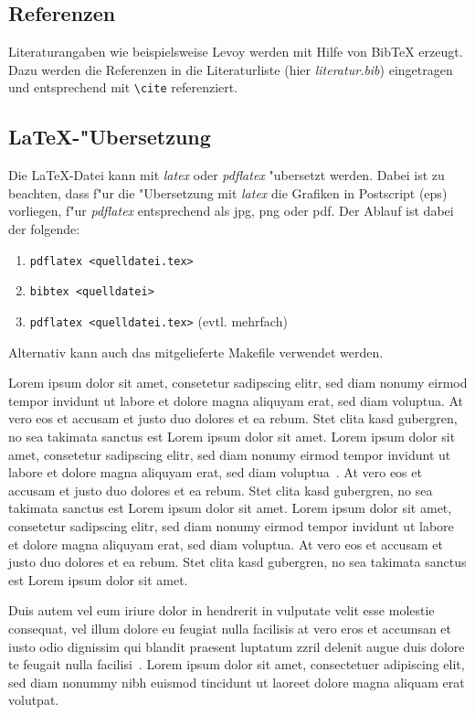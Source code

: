 \documentclass[journal]{vgtc}
\begin{document}
\subsection{Referenzen}

Literaturangaben wie beispielsweise Levoy \cite{levoy:1989:DSV} werden
mit Hilfe von BibTeX erzeugt. Dazu werden die Referenzen in die
Literaturliste (hier \emph{literatur.bib}) eingetragen und
entsprechend mit \verb|\cite| referenziert.

\subsection{\LaTeX-"Ubersetzung}

Die \LaTeX-Datei kann mit \emph{latex} oder \emph{pdflatex} "ubersetzt
werden. Dabei ist zu beachten, dass f"ur die "Ubersetzung mit
\emph{latex} die Grafiken in Postscript (eps) vorliegen, f"ur
\emph{pdflatex} entsprechend als jpg, png oder pdf.  Der Ablauf ist
dabei der folgende:
\begin{enumerate}
\item \verb|pdflatex <quelldatei.tex>|
\item \verb|bibtex <quelldatei>|
\item \verb|pdflatex <quelldatei.tex>| (evtl. mehrfach)
\end{enumerate}
Alternativ kann auch das mitgelieferte Makefile verwendet werden.





Lorem ipsum dolor sit amet, consetetur sadipscing elitr, sed diam
nonumy eirmod tempor invidunt ut labore et dolore magna aliquyam erat,
sed diam voluptua. At vero eos et accusam et justo duo dolores et ea
rebum. Stet clita kasd gubergren, no sea takimata sanctus est Lorem
ipsum dolor sit amet. Lorem ipsum dolor sit amet, consetetur
sadipscing elitr, sed diam nonumy eirmod tempor invidunt ut labore et
dolore magna aliquyam erat, sed diam
voluptua~\cite{kitware2003,Max:1995:OMF}. At vero eos et accusam et
justo duo dolores et ea rebum. Stet clita kasd gubergren, no sea
takimata sanctus est Lorem ipsum dolor sit amet. Lorem ipsum dolor sit
amet, consetetur sadipscing elitr, sed diam nonumy eirmod tempor
invidunt ut labore et dolore magna aliquyam erat, sed diam
voluptua. At vero eos et accusam et justo duo dolores et ea
rebum. Stet clita kasd gubergren, no sea takimata sanctus est Lorem
ipsum dolor sit amet.

Duis autem vel eum iriure dolor in hendrerit in vulputate velit esse
molestie consequat, vel illum dolore eu feugiat nulla facilisis at
vero eros et accumsan et iusto odio dignissim qui blandit praesent
luptatum zzril delenit augue duis dolore te feugait nulla
facilisi~\cite{notes2002}. Lorem ipsum dolor sit amet, consectetuer
adipiscing elit, sed diam nonummy nibh euismod tincidunt ut laoreet
dolore magna aliquam erat volutpat.
\end{document}
